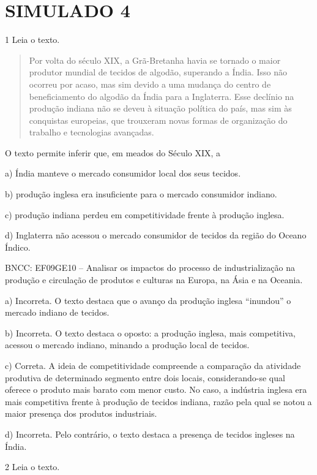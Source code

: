 \chapter{SIMULADO 4}

\num{1} Leia o texto.

\begin{quote}
Por volta do século XIX, a Grã-Bretanha havia se tornado o maior produtor mundial de tecidos de algodão, superando a Índia. Isso não ocorreu por acaso, mas sim devido a uma mudança do centro de beneficiamento do algodão da Índia para a Inglaterra. Esse declínio na produção indiana não se deveu à situação política do país, mas sim às conquistas europeias, que trouxeram novas formas de organização do trabalho e tecnologias avançadas.

\end{quote}

O texto permite inferir que, em meados do Século XIX, a

a)  Índia manteve o mercado consumidor local dos seus tecidos.

b)  produção inglesa era insuficiente para o mercado consumidor indiano.

c)  produção indiana perdeu em competitividade frente à produção
    inglesa.

d)  Inglaterra não acessou o mercado consumidor de tecidos da região
    do Oceano Índico.

BNCC: EF09GE10 -- Analisar os impactos do processo de industrialização na
produção e circulação de produtos e culturas na Europa, na Ásia e na
Oceania.

a) Incorreta. O texto destaca que o avanço da produção inglesa
``inundou'' o mercado indiano de tecidos.

b) Incorreta. O texto destaca o oposto: a produção inglesa, mais
competitiva, acessou o mercado indiano, minando a produção local de
tecidos.

c) Correta. A ideia de competitividade compreende a
comparação da atividade produtiva de determinado segmento entre dois
locais, considerando-se qual oferece o produto mais barato com menor custo. No caso, a
indústria inglesa era mais competitiva frente à produção de tecidos
indiana, razão pela qual se notou a maior presença dos produtos
industriais.

d) Incorreta. Pelo contrário, o texto destaca a presença de tecidos
ingleses na Índia.


\num{2} Leia o texto.

